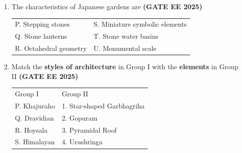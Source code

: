 \documentclass[journal,12pt,onecolumn]{IEEEtran}
\theoremstyle{remark}
\begin{document}
\begin{enumerate}
\begin{tabular}{p{}p{}}
\end{tabular} 
\begin{enumerate}
\end{enumerate}
\item The characteristics of Japanese gardens are \hfill \textbf{(GATE EE 2025)}
\newline
\begin{tabular}{p{}p{}}
P. Stepping stones     & S. Miniature symbolic elements  \\
Q. Stone lanterns      & T. Stone water basins\\
R. Octahedral geometry & U. Monumental scale\\
\end{tabular}
\begin{enumerate}
\end{enumerate}
\item Match the \textbf{styles of architecture} in Group I with the \textbf{elements} in Group II \hfill \textbf{(GATE EE 2025)}
\newline
\begin{tabular}{p{}p{}}
  Group I   & Group II \\
P. Khajuraho     & 1. Star-shaped Garbhagriha\\
Q. Dravidian & 2. Gopuram\\
R. Hoysala & 3. Pyramidal Roof\\
S. Himalayan & 4. Urushringa\\
\end{tabular}
\begin{enumerate}
\end{enumerate}
\end{enumerate}
\end{document}
